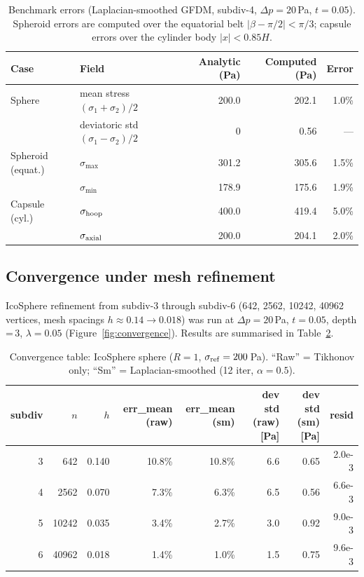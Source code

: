 \documentclass[11pt]{article}
\begin{document}
\begin{table}[ht]\centering
\caption{Benchmark errors (Laplacian-smoothed GFDM, subdiv-4, $\Delta p=20$\,Pa,
$t=0.05$).  Spheroid errors are computed over the equatorial belt
$|\beta-\pi/2|<\pi/3$; capsule errors over the cylinder body $|x|<0.85H$.}
\label{tab:benchmark}
\begin{tabular}{llrrr}
\toprule
Case & Field & Analytic (Pa) & Computed (Pa) & Error \\
\midrule
Sphere          & mean stress $(\sigma_1+\sigma_2)/2$ & 200.0 & 202.1 & 1.0\% \\
                & deviatoric std $(\sigma_1-\sigma_2)/2$ & 0    & 0.56  & —    \\[4pt]
Spheroid (equat.) & $\sigma_{\max}$ & 301.2 & 305.6 & 1.5\% \\
                  & $\sigma_{\min}$ & 178.9 & 175.6 & 1.9\% \\[4pt]
Capsule (cyl.)  & $\sigma_{\rm hoop}$  & 400.0 & 419.4 & 5.0\% \\
                & $\sigma_{\rm axial}$ & 200.0 & 204.1 & 2.0\% \\
\bottomrule
\end{tabular}
\end{table}

\subsection{Convergence under mesh refinement}

IcoSphere refinement from subdiv-3 through subdiv-6 (642, 2562, 10242,
40962 vertices, mesh spacings $h\approx0.14\to0.018$) was run at
$\Delta p=20$\,Pa, $t=0.05$, depth\,=\,3, $\lambda=0.05$
(Figure~\ref{fig:convergence}).  Results are summarised in
Table~\ref{tab:convergence}.

\begin{table}[h]\centering
\caption{Convergence table: IcoSphere sphere ($R=1$, $\sigma_{\rm ref}=200$\,Pa).
``Raw'' = Tikhonov only; ``Sm'' = Laplacian-smoothed (12 iter, $\alpha=0.5$).}
\label{tab:convergence}
\begin{tabular}{rrrrrrrr}
\toprule
subdiv & $n$ & $h$ & err\_mean (raw) & err\_mean (sm) & dev std (raw) [Pa] & dev std (sm) [Pa] & resid \\
\midrule
3 &   642 & 0.140 & 10.8\% & 10.8\% & 6.6 & 0.65 & 2.0e-3 \\
4 &  2562 & 0.070 &  7.3\% &  6.3\% & 6.5 & 0.56 & 6.6e-3 \\
5 & 10242 & 0.035 &  3.4\% &  2.7\% & 3.0 & 0.92 & 9.0e-3 \\
6 & 40962 & 0.018 &  1.4\% &  1.0\% & 1.5 & 0.75 & 9.6e-3 \\
\bottomrule
\end{tabular}
\end{table}
\end{document}
